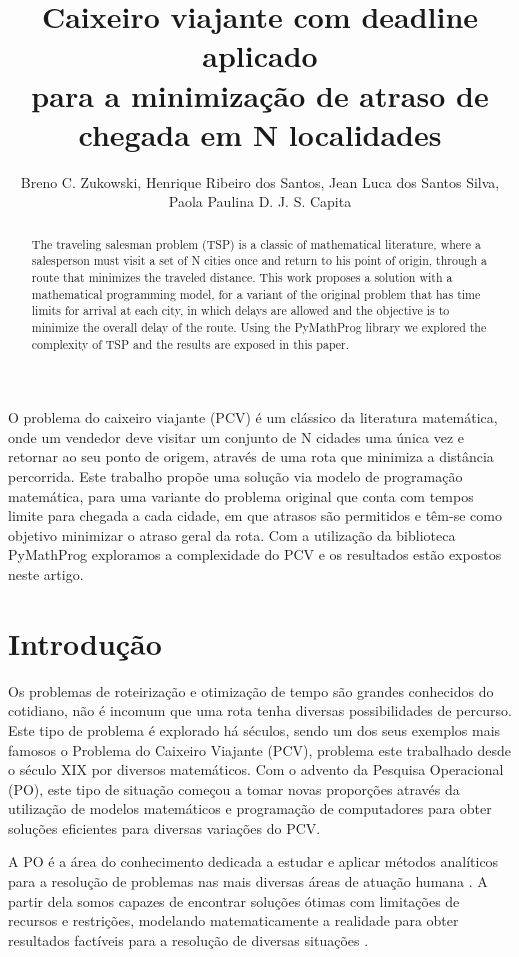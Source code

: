 \documentclass[12pt]{article}
\title{Caixeiro viajante com deadline aplicado\\ para a minimização de atraso de chegada em N localidades}
\author{Breno C. Zukowski\inst{1}, Henrique Ribeiro dos Santos\inst{1}, Jean Luca dos Santos Silva\inst{1}, \\ Paola Paulina D. J. S. Capita\inst{1}}
\begin{document}
\maketitle
\begin{abstract}
  The traveling salesman problem (TSP) is a classic of mathematical literature, where a salesperson must visit a set of N cities once and return to his point of origin, through a route that minimizes the traveled distance. This work proposes a solution with a mathematical programming model, for a variant of the original problem that has time limits for arrival at each city, in which delays are allowed and the objective is to minimize the overall delay of the route. Using the PyMathProg library we explored the complexity of TSP and the results are exposed in this paper.\end{abstract}

\begin{resumo}
  O problema do caixeiro viajante (PCV) é um clássico da literatura matemática, onde um vendedor deve visitar um conjunto de N cidades uma única vez e retornar ao seu ponto de origem, através de uma rota que minimiza a distância percorrida. Este trabalho propõe uma solução via modelo de programação matemática, para uma variante do problema original que conta com tempos limite para chegada a cada cidade, em que atrasos são permitidos e têm-se como objetivo minimizar o atraso geral da rota. Com a utilização da biblioteca PyMathProg exploramos a complexidade do PCV e os resultados estão expostos neste artigo.
\end{resumo}


\section{Introdução}
Os problemas de roteirização e otimização de tempo são grandes conhecidos do cotidiano, não é incomum que uma rota tenha diversas possibilidades de percurso. Este tipo de problema é explorado há séculos, sendo um dos seus exemplos mais famosos o Problema do Caixeiro Viajante (PCV), problema este trabalhado desde o século XIX por diversos matemáticos. Com o advento da Pesquisa Operacional (PO), este tipo de situação começou a tomar novas proporções através da utilização de modelos matemáticos e programação de computadores para obter soluções eficientes para diversas variações do PCV.

A PO é a área do conhecimento dedicada a estudar e aplicar métodos analíticos para a resolução de problemas nas mais diversas áreas de atuação humana \cite{sobrapo2017}. A partir dela somos capazes de encontrar soluções ótimas com limitações de recursos e restrições, modelando matematicamente a realidade para obter resultados factíveis para a resolução de diversas situações \cite{hillier2013introdução}.
\end{document}
